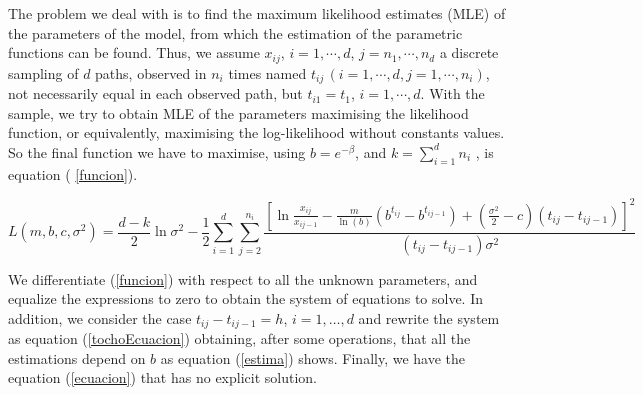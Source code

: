\documentclass{sig-alternate}
\begin{document}
The problem we deal with is to find the maximum likelihood estimates (MLE) of the parameters of the model, from which the estimation of the parametric functions can be found. Thus, we assume $x_{ij}$, $i=1,\cdots,d$, $j=n_1, \cdots, n_d$ a discrete sampling of $d$ paths, observed in $n_i$ times named $t_{ij}\,(i=1,\cdots,d,j=1,\cdots,n_i )$, not necessarily equal in each observed path, but $t_{i1}=t_{1}$, $i=1,\cdots, d$. With the sample, we try to obtain MLE of the parameters maximising the likelihood function, or equivalently, maximising the log-likelihood without constants values. So the final function we have to maximise, using $b=e^{-\beta}$, and $k=\sum_{i=1}^d n_i$ , is equation ( \ref{funcion}).

\begin{figure*}[htb]
\begin{equation}
\label{funcion}
L(m,b,c,\sigma^2)=\frac{d-k}{2}\ln\sigma^2
-\frac{1}{2}\sum_{i=1}^d\sum_{j=2}^{n_i}\frac{\left[\ln\frac{x_{ij}}{x_{ij-1}}-
    \frac{m}{\ln(b)} \left(b^{t_{ij}}-b^{t_{ij-1}}\right)+\left(\frac{\sigma^2}{2}-c\right)(t_{ij}-t_{ij-1})\right]^2}
    {(t_{ij}-t_{ij-1})\sigma^2}
\end{equation}
\end{figure*}

We differentiate (\ref{funcion}) with respect to all the unknown parameters, and equalize the expressions to zero to obtain the system of equations to solve. In addition, we consider the case $t_{ij}-t_{ij-1}=h$, $i=1,\ldots,d$ and rewrite the system as equation (\ref{tochoEcuacion}) obtaining, after some operations, that all the estimations depend on $b$ as equation (\ref{estima}) shows. Finally, we have the equation (\ref{ecuacion}) that has no explicit solution.
\end{document}
